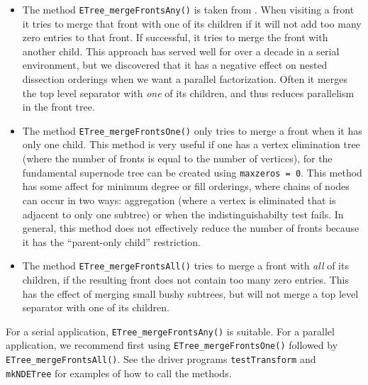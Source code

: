 \begin{itemize}
\item
The method {\tt ETree\_mergeFrontsAny()} is taken from 
\cite{ash89-relaxed}. 
When visiting a front it tries to merge that front
with one of its children if it will not add too many zero entries
to that front. If successful, it tries to merge the front with
another child.
This approach has served well for over a decade in a serial
environment, but we discovered that it has a negative effect
on nested dissection orderings when we want a parallel
factorization.
Often it merges the top level separator with {\it one} of its
children, and thus reduces parallelism in the front tree.
\item
The method {\tt ETree\_mergeFrontsOne()} 
only tries to merge a front when it has only one child.
This method is very useful if one has a vertex elimination tree
(where the number of fronts is equal to the number of vertices),
for the fundamental supernode tree can be created using
{\tt maxzeros = 0}.
This method has some affect for minimum degree or fill orderings,
where chains of nodes can occur in two ways: aggregation (where a
vertex is eliminated that is adjacent to only one subtree) or when
the indistinguishabilty test fails.
In general, this method does not effectively reduce the number
of fronts because it has the ``parent-only child'' restriction.
\item
The method {\tt ETree\_mergeFrontsAll()} tries to merge a front
with {\it all} of its children, if the resulting front does not
contain too many zero entries.
This has the effect of merging small bushy subtrees, but will not
merge a top level separator with one of its children.
\end{itemize}
For a serial application, {\tt ETree\_mergeFrontsAny()} is suitable.
For a parallel application, we recommend first using
{\tt ETree\_mergeFrontsOne()}
followed by
{\tt ETree\_mergeFrontsAll()}.
See the driver programs {\tt testTransform} and {\tt mkNDETree}
for examples of how to call the methods.
\par
